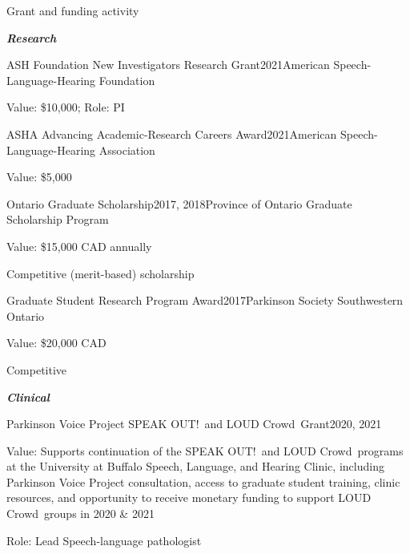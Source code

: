 \documentclass{resume} %
\begin{document}
\begin{rSection}{Grant and funding activity}

\begin{center}
	{\bf \emph{Research}}
\end{center}

\begin{rSubsection}{ASH Foundation New Investigators Research Grant}{2021}{American Speech-Language-Hearing Foundation}{}
	\item Value: \$10,000; Role: PI
\end{rSubsection}

\begin{rSubsection}{ASHA Advancing Academic-Research Careers Award}{2021}{American Speech-Language-Hearing Association}{}
	\item Value: \$5,000
\end{rSubsection}

\begin{rSubsection}{Ontario Graduate Scholarship}{2017, 2018}{Province of Ontario Graduate Scholarship Program}{}
	\item Value: \$15,000 CAD annually
	\item Competitive (merit-based) scholarship
\end{rSubsection}

\begin{rSubsection}{Graduate Student Research Program Award}{2017}{Parkinson Society Southwestern Ontario}{}
	\item Value: \$20,000 CAD
	\item Competitive
\end{rSubsection}
%


\newpage
\begin{center}
	{\bf \emph{Clinical}}
\end{center}

\begin{rSubsection}{Parkinson Voice Project SPEAK OUT!\textregistered \ and LOUD Crowd\textregistered \ Grant}{2020, 2021}{}{} %
	\item Value: Supports continuation of the SPEAK OUT!\textregistered \ and LOUD Crowd\textregistered \ programs at the University at Buffalo Speech, Language, and Hearing Clinic, including Parkinson Voice Project consultation, access to graduate student training, clinic resources, and opportunity to receive monetary funding to support LOUD Crowd\textregistered \ groups in 2020 \& 2021
	\item Role: Lead Speech-language pathologist
\end{rSubsection}




\end{rSection}
\end{document}
